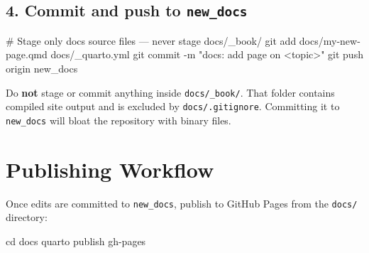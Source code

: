 \documentclass[
  letterpaper,
  DIV=11,
  numbers=noendperiod]{scrreprt}
\newenvironment{Shaded}{\begin{snugshade}}{\end{snugshade}}
\newcommand{\AttributeTok}[1]{\textcolor[rgb]{0.40,0.45,0.13}{#1}}
\newcommand{\BuiltInTok}[1]{\textcolor[rgb]{0.00,0.23,0.31}{#1}}
\newcommand{\CommentTok}[1]{\textcolor[rgb]{0.37,0.37,0.37}{#1}}
\newcommand{\ExtensionTok}[1]{\textcolor[rgb]{0.00,0.23,0.31}{#1}}
\newcommand{\FunctionTok}[1]{\textcolor[rgb]{0.28,0.35,0.67}{#1}}
\newcommand{\NormalTok}[1]{\textcolor[rgb]{0.00,0.23,0.31}{#1}}
\newcommand{\StringTok}[1]{\textcolor[rgb]{0.13,0.47,0.30}{#1}}
\begin{document}
\subsection{\texorpdfstring{4. Commit and push to
\texttt{new\_docs}}{4. Commit and push to new\_docs}}\label{commit-and-push-to-new_docs}

\begin{Shaded}
\begin{Highlighting}[]
\CommentTok{\# Stage only docs source files — never stage docs/\_book/}
\FunctionTok{git}\NormalTok{ add docs/my{-}new{-}page.qmd docs/\_quarto.yml}
\FunctionTok{git}\NormalTok{ commit }\AttributeTok{{-}m} \StringTok{"docs: add page on \textless{}topic\textgreater{}"}
\FunctionTok{git}\NormalTok{ push origin new\_docs}
\end{Highlighting}
\end{Shaded}

\begin{tcolorbox}[enhanced jigsaw, arc=.35mm, bottomrule=.15mm, bottomtitle=1mm, breakable, colback=white, colbacktitle=quarto-callout-warning-color!10!white, colframe=quarto-callout-warning-color-frame, coltitle=black, left=2mm, leftrule=.75mm, opacityback=0, opacitybacktitle=0.6, rightrule=.15mm, title=\textcolor{quarto-callout-warning-color}{\faExclamationTriangle}\hspace{0.5em}{Warning}, titlerule=0mm, toprule=.15mm, toptitle=1mm]

Do \textbf{not} stage or commit anything inside \texttt{docs/\_book/}.
That folder contains compiled site output and is excluded by
\texttt{docs/.gitignore}. Committing it to \texttt{new\_docs} will bloat
the repository with binary files.

\end{tcolorbox}

\section{Publishing Workflow}\label{publishing-workflow}

Once edits are committed to \texttt{new\_docs}, publish to GitHub Pages
from the \texttt{docs/} directory:

\begin{Shaded}
\begin{Highlighting}[]
\BuiltInTok{cd}\NormalTok{ docs}
\ExtensionTok{quarto}\NormalTok{ publish gh{-}pages}
\end{Highlighting}
\end{Shaded}
\end{document}
